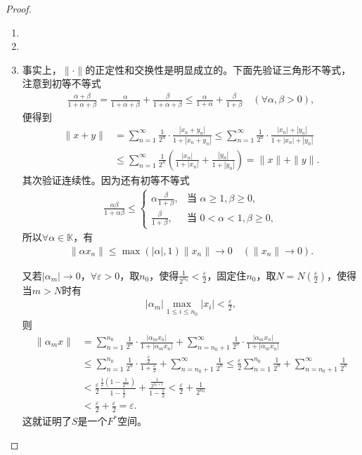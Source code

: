 \documentclass[../../main.tex]{subfiles}%
\begin{document}
\begin{proof}
\begin{enumerate}[(1)]
\item 

\item 

\item 事实上，$\|\cdot\|$的正定性和交换性是明显成立的。下面先验证三角形不等式，注意到初等不等式
\begin{align*}
\frac{\alpha+\beta}{1+\alpha+\beta}=\frac{\alpha}{1+\alpha+\beta}+\frac{\beta}{1+\alpha+\beta}\leqslant\frac{\alpha}{1+\alpha}+\frac{\beta}{1+\beta}\quad(\forall\alpha,\beta>0),
\end{align*}
便得到
\begin{align*}
\|x+y\|&=\sum_{n=1}^\infty\frac{1}{2^n}\cdot\frac{|x_n+y_n|}{1+|x_n+y_n|}
\leqslant\sum_{n=1}^\infty\frac{1}{2^n}\cdot\frac{|x_n|+|y_n|}{1+|x_n|+|y_n|}\\
&\leqslant\sum_{n=1}^\infty\frac{1}{2^n}\left(\frac{|x_n|}{1+|x_n|}+\frac{|y_n|}{1+|y_n|}\right)=\|x\|+\|y\|.
\end{align*}
其次验证连续性。因为还有初等不等式
\begin{align*}
\frac{\alpha\beta}{1+\alpha\beta}\leqslant\begin{cases}
\alpha\frac{\beta}{1+\beta},&\text{当 }\alpha\geqslant1,\beta\geqslant0,\\
\frac{\beta}{1+\beta},&\text{当 }0<\alpha<1,\beta\geqslant0,
\end{cases}
\end{align*}
所以$\forall\alpha\in\mathbb{K}$，有
\begin{align*}
\|\alpha x_n\|\leqslant\max(|\alpha|,1)\|x_n\|\to0\quad(\|x_n\|\to0).
\end{align*}

又若$|\alpha_m|\to0$，$\forall\varepsilon>0$，取$n_0$，使得$\frac{1}{2^{n_0}}<\frac{\varepsilon}{2}$，固定住$n_0$，取$N=N(\frac{\varepsilon}{2})$，使得当$m>N$时有
\begin{align*}
|\alpha_m|\max_{1\leqslant i\leqslant n_0}|x_i|<\frac{\varepsilon}{2},
\end{align*}
则
\begin{align*}
\parallel \alpha _mx\parallel &=\sum_{n=1}^{n_0}{\frac{1}{2^n}}\cdot \frac{|\alpha _mx_n|}{1+|\alpha _mx_n|}+\sum_{n=n_0+1}^{\infty}{\frac{1}{2^n}}\cdot \frac{|\alpha _mx_n|}{1+|\alpha _mx_n|}
\\
&\leqslant \sum_{n=1}^{n_0}{\frac{1}{2^n}}\cdot \frac{\frac{\varepsilon}{2}}{1+\frac{\varepsilon}{2}}+\sum_{n=n_0+1}^{\infty}{\frac{1}{2^n}}\leqslant \frac{\varepsilon}{2}\sum_{n=1}^{n_0}{\frac{1}{2^n}}+\sum_{n=n_0+1}^{\infty}{\frac{1}{2^n}}
\\
&<\frac{\varepsilon}{2}\frac{\frac{1}{2}\left( 1-\frac{1}{2^{n_0}} \right)}{1-\frac{1}{2}}+\frac{\frac{1}{2^{n_0+1}}}{1-\frac{1}{2}}<\frac{\varepsilon}{2}+\frac{1}{2^{n_0}}
\\
&<\frac{\varepsilon}{2}+\frac{\varepsilon}{2}=\varepsilon .
\end{align*}
这就证明了$S$是一个$F^*$空间。


\end{enumerate}
\end{proof}
\end{document}
